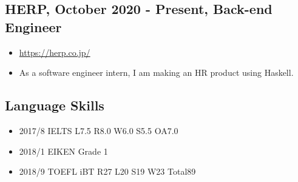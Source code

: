 \documentclass{article}
\begin{document}
    \subsection*{HERP, October 2020 - Present, Back-end Engineer}
        \begin{itemize}
            \item \url{https://herp.co.jp/}
            \item As a software engineer intern, I am making an HR product using Haskell.
        \end{itemize}

\subsection*{Language Skills}
    \begin{itemize}
        \item 2017/8 IELTS L7.5 R8.0 W6.0 S5.5 OA7.0
        \item 2018/1 EIKEN Grade 1
        \item 2018/9 TOEFL iBT R27 L20 S19 W23 Total89
    \end{itemize}
\end{document}
